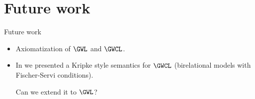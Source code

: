 \section{Future work}
\begin{frame}{Future work}


\begin{itemize}
\item Axiomatization of $\GWL$ and $\GWCL$.

\item In  we presented a Kripke style semantics for $\GWCL$
  (birelational models with Fischer-Servi conditions).

  Can we extend it to $\GWL$?

  


\end{itemize}



\end{frame}






  

